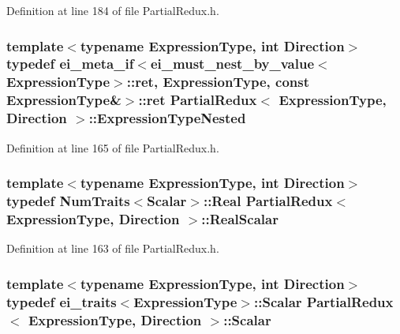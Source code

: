 Definition at line 184 of file Partial\-Redux.\-h.

\hypertarget{class_partial_redux_a0f17bbdfa61d2bd1e3d271dc82c595b8}{
\subsubsection[{Expression\-Type\-Nested}]{\setlength{\rightskip}{0pt plus 5cm}template$<$typename Expression\-Type, int Direction$>$ typedef {\bf ei\-\_\-meta\-\_\-if}$<${\bf ei\-\_\-must\-\_\-nest\-\_\-by\-\_\-value}$<$Expression\-Type$>$\-::{\bf ret}, Expression\-Type, const Expression\-Type\&$>$\-::{\bf ret} {\bf Partial\-Redux}$<$ Expression\-Type, Direction $>$\-::{\bf Expression\-Type\-Nested}}}\label{class_partial_redux_a0f17bbdfa61d2bd1e3d271dc82c595b8}


Definition at line 165 of file Partial\-Redux.\-h.

\hypertarget{class_partial_redux_ab90e980b51024c769907a8646b38c713}{
\subsubsection[{Real\-Scalar}]{\setlength{\rightskip}{0pt plus 5cm}template$<$typename Expression\-Type, int Direction$>$ typedef {\bf Num\-Traits}$<${\bf Scalar}$>$\-::Real {\bf Partial\-Redux}$<$ Expression\-Type, Direction $>$\-::{\bf Real\-Scalar}}}\label{class_partial_redux_ab90e980b51024c769907a8646b38c713}


Definition at line 163 of file Partial\-Redux.\-h.

\hypertarget{class_partial_redux_a5884ea45b5cd9ba86feef9193cf56fa8}{
\subsubsection[{Scalar}]{\setlength{\rightskip}{0pt plus 5cm}template$<$typename Expression\-Type, int Direction$>$ typedef {\bf ei\-\_\-traits}$<$Expression\-Type$>$\-::{\bf Scalar} {\bf Partial\-Redux}$<$ Expression\-Type, Direction $>$\-::{\bf Scalar}}}\label{class_partial_redux_a5884ea45b5cd9ba86feef9193cf56fa8}


